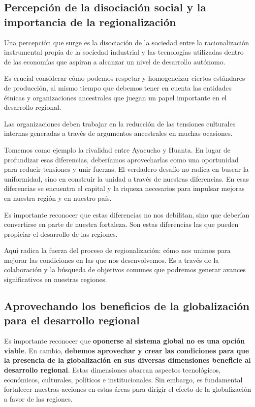 \documentclass[
  a4paper,
]{article}
\begin{document}
\subsection{Percepción de la disociación social y la importancia de la
regionalización}\label{percepciuxf3n-de-la-disociaciuxf3n-social-y-la-importancia-de-la-regionalizaciuxf3n}

Una percepción que surge es la disociación de la sociedad entre la
racionalización instrumental propia de la sociedad industrial y las
tecnologías utilizadas dentro de las economías que aspiran a alcanzar un
nivel de desarrollo autónomo.

Es crucial considerar cómo podemos respetar y homogeneizar ciertos
estándares de producción, al mismo tiempo que debemos tener en cuenta
las entidades étnicas y organizaciones ancestrales que juegan un papel
importante en el desarrollo regional.

Las organizaciones deben trabajar en la reducción de las tensiones
culturales internas generadas a través de argumentos ancestrales en
muchas ocasiones.

Tomemos como ejemplo la rivalidad entre Ayacucho y Huanta. En lugar de
profundizar esas diferencias, deberíamos aprovecharlas como una
oportunidad para reducir tensiones y unir fuerzas. El verdadero desafío
no radica en buscar la uniformidad, sino en construir la unidad a través
de nuestras diferencias. En esas diferencias se encuentra el capital y
la riqueza necesarios para impulsar mejoras en nuestra región y en
nuestro país.

Es importante reconocer que estas diferencias no nos debilitan, sino que
deberían convertirse en parte de nuestra fortaleza. Son estas
diferencias las que pueden propiciar el desarrollo de las regiones.

Aquí radica la fuerza del proceso de regionalización: cómo nos unimos
para mejorar las condiciones en las que nos desenvolvemos. Es a través
de la colaboración y la búsqueda de objetivos comunes que podremos
generar avances significativos en nuestras regiones.

\subsection{Aprovechando los beneficios de la globalización para el
desarrollo
regional}\label{aprovechando-los-beneficios-de-la-globalizaciuxf3n-para-el-desarrollo-regional}

Es importante reconocer que \textbf{oponerse al sistema global no es una
opción viable}. En cambio, \textbf{debemos aprovechar y crear las
condiciones para que la presencia de la globalización en sus diversas
dimensiones beneficie al desarrollo regional}. Estas dimensiones abarcan
aspectos tecnológicos, económicos, culturales, políticos e
institucionales. Sin embargo, es fundamental fortalecer nuestras
acciones en estas áreas para dirigir el efecto de la globalización a
favor de las regiones.
\end{document}

